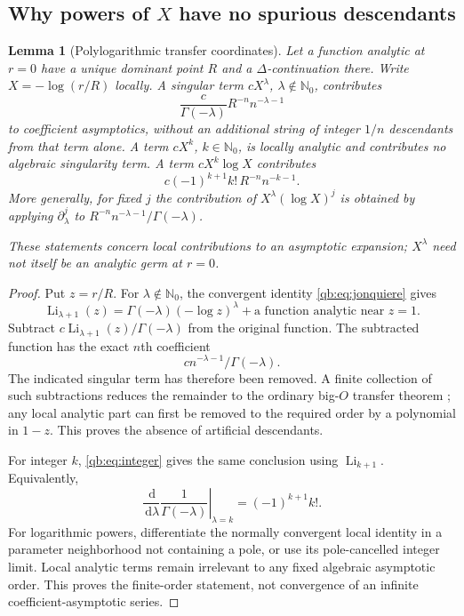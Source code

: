 \documentclass[11pt,a4paper]{article}
\newtheorem{lemma}[theorem]{Lemma}
\theoremstyle{definition}\newtheorem{definition}[theorem]{Definition}
\theoremstyle{remark}\newtheorem{remark}[theorem]{Remark}
\newcommand{\Li}{\operatorname{Li}}
\newcommand{\dd}{\,\mathrm d}
\newcommand{\N}{\mathbb N}
\numberwithin{equation}{section}
\begin{document}
\subsection{Why powers of \texorpdfstring{$X$}{X} have no spurious descendants}

\begin{lemma}[Polylogarithmic transfer coordinates]\label{qb:lem:transfer}
Let a function analytic at $r=0$ have a unique dominant point $R$ and a
$\Delta$-continuation there. Write $X=-\log(r/R)$ locally. A singular term
$cX^\lambda$, $\lambda\notin\N_0$, contributes
\begin{equation}\label{qb:eq:power-transfer}
 \frac{c}{\Gamma(-\lambda)}R^{-n}n^{-\lambda-1}
\end{equation}
to coefficient asymptotics, without an additional string of integer
$1/n$ descendants from that term alone. A term $cX^k$, $k\in\N_0$, is
locally analytic and contributes no algebraic singularity term. A term
$cX^k\log X$ contributes
\begin{equation}\label{qb:eq:integer-transfer}
 c(-1)^{k+1}k!\,R^{-n}n^{-k-1}.
\end{equation}
More generally, for fixed $j$ the contribution of
$X^\lambda(\log X)^j$ is obtained by applying $\partial_\lambda^j$ to
$R^{-n}n^{-\lambda-1}/\Gamma(-\lambda)$.

These statements concern local contributions to an asymptotic expansion;
$X^\lambda$ need not itself be an analytic germ at $r=0$.
\end{lemma}
\begin{proof}
Put $z=r/R$. For $\lambda\notin\N_0$, the convergent identity
\eqref{qb:eq:jonquiere} gives
\[
 \Li_{\lambda+1}(z)=\Gamma(-\lambda)(-\log z)^\lambda+
 \text{a function analytic near }z=1.
\]
Subtract $c\Li_{\lambda+1}(z)/\Gamma(-\lambda)$ from the original
function. The subtracted function has the exact $n$th coefficient
\[c n^{-\lambda-1}/\Gamma(-\lambda).\]
The indicated singular term has therefore been removed. A finite collection of such subtractions reduces the
remainder to the ordinary big-$O$ transfer theorem \cite{fo,fs}; any local
analytic part can first be removed to the required order by a polynomial
in $1-z$. This proves the absence of artificial descendants.

For integer $k$, \eqref{qb:eq:integer} gives the same conclusion using
$\Li_{k+1}$. Equivalently,
\[
 \left.\frac{\dd}{\dd\lambda}\frac1{\Gamma(-\lambda)}
 \right|_{\lambda=k}=(-1)^{k+1}k!.
\]
For logarithmic powers, differentiate the normally convergent local
identity in a parameter neighborhood not containing a pole, or use its
pole-cancelled integer limit. Local analytic terms remain irrelevant to
any fixed algebraic asymptotic order. This proves the finite-order
statement, not convergence of an infinite coefficient-asymptotic series.
\end{proof}
\end{document}
